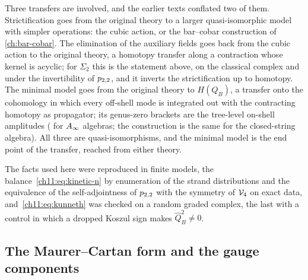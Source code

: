 Three transfers are involved, and the earlier texts conflated two of them.
Strictification goes from the original theory to a larger quasi-isomorphic model with simpler operations: the cubic action, or the bar--cobar construction of \cref{ch:bar-cobar}.
The elimination of the auxiliary fields goes back from the cubic action to the original theory, a homotopy transfer along a contraction whose kernel is acyclic; for $\Sigma_2$ this is the statement above, on the classical complex and under the invertibility of $p_{2,2}$, and it inverts the strictification up to homotopy.
The minimal model goes from the original theory to $H(Q_B)$, a transfer onto the cohomology in which every off-shell mode is integrated out with the contracting homotopy as propagator; its genus-zero brackets are the tree-level on-shell amplitudes (\cite{Kajiura:2007:NoncommutativeHomotopyAlgebras} for $A_\infty$ algebras; the construction is the same for the closed-string \Loo{} algebra).
All three are quasi-isomorphisms, and the minimal model is the end point of the transfer, reached from either theory.

The facts used here were reproduced in finite models, the balance~\eqref{ch11:eq:kinetic-n} by enumeration of the strand distributions and the equivalence of the self-adjointness of $p_{2,2}$ with the symmetry of $\mathcal{V}_{4}$ on exact data, and~\eqref{ch11:eq:kunneth} was checked on a random graded complex, the last with a control in which a dropped Koszul sign makes $\hat{Q}_B^2 \ne 0$.

\subsection{The Maurer--Cartan form and the gauge components}
\label{ch11:sec:mc}

